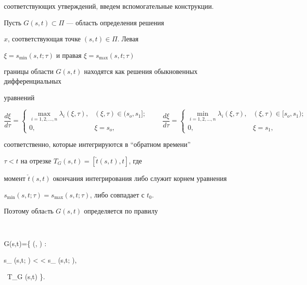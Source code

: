 соответствующих утверждений, введем вспомогательные конструкции.





Пусть $G(s,t) \subset {\Pi}$ --- область определения решения 


$x$, соответствующая точке $(s,t) \in {\Pi}$. Левая 


$\xi=s_{\min} (s,t; \tau)$ и правая $\xi=s_{\max} (s,t; \tau)$ 


границы области $G(s,t)$ находятся как решения обыкновенных дифференциальных 


уравнений


$$


\frac{d\xi}{d\tau}=


\begin{cases}


\max\limits_{i=1,2,\dotsc,n} \lambda_i(\xi,\tau), 


& (\xi,\tau) \in (s_o,s_1]; \\


0, & \xi=s_o, 


\end{cases}


\qquad


\frac{d\xi}{d\tau}=


\begin{cases}


\min\limits_{i=1,2,\dotsc,n} \lambda_i(\xi,\tau), 


& (\xi,\tau) \in [s_o,s_1); \\


0, & \xi=s_1, 


\end{cases}


$$


соответственно, которые интегрируются в ``обратном времени''


$\tau < t$ на отрезке $T_G (s,t)=[\check{t}(s,t),t]$, где


момент $\check{t}(s,t)$ окончания интегрирования либо служит корнем уравнения 


$s_{\min} (s,t; \tau)=s_{\max} (s,t; \tau)$, либо совпадает с $t_0$.


Поэтому облаcть $G (s,t)$ определяется по правилу


$$


G(s,t)=\{ (\xi, \tau) \in {\Pi}: 


s_{\min} (s,t; \tau) < \xi < s_{\max} (s,t; \tau),


\ \tau \in T_G (s,t) \}.


